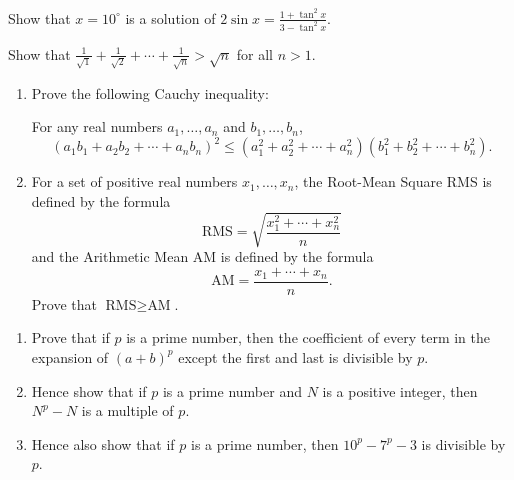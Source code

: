 \begin{problems}
    \problem Show that $x = 10^\circ$ is a solution of $2\sin x=\frac{1 +
    \tan^2x}{3 - \tan^2x}$. 
    
    \problem Show that $\frac{1}{\sqrt{1}} + \frac{1}{\sqrt{2}} + \cdots +
    \frac{1}{\sqrt{n}} > \sqrt{n}$ for all $n > 1$. 
    
    \problem 
    \begin{enumerate}
        \item Prove the following Cauchy inequality:
            \par For any real numbers $a_1, \ldots, a_n$ and $b_1, \ldots, b_n$,
            \[(a_{1}b_{1} + a_{2}b_{2} + \cdots +a_{n}b_{n})^2\leq (a_{1}^2 +
            a_{2}^2 + \cdots + a_{n}^2)(b_{1}^2 + b_{2}^2 + \cdots +
            b_{n}^2).\]
        
        \item For a set of positive real numbers $x_1, \ldots, x_n$, the
            Root-Mean Square RMS is defined by the formula 
            \[\text{RMS} = \sqrt{\frac{x_{1}^2 + \cdots + x_{n}^2}{n}}\] 
            and the Arithmetic Mean AM is defined by the formula 
            \[\text{AM} = \frac{x_{1} + \cdots + x_{n}}{n}.\] 
            Prove that $\text{RMS} \geq \text{AM}$.
    \end{enumerate}
    
    \problem 
    \begin{enumerate}
        \item Prove that if $p$ is a prime number, then the coefficient of
            every term in the expansion of $(a + b)^p$ except the first and
            last is divisible by $p$. 
        
        \item Hence show that if $p$ is a prime number and $N$ is a positive
            integer, then $N^{p} - N$ is a multiple of $p$. 
        
        \item Hence also show that if $p$ is a prime number, then $10^p - 7^p -
            3$ is divisible by $p$. 
    \end{enumerate}
\end{problems}
